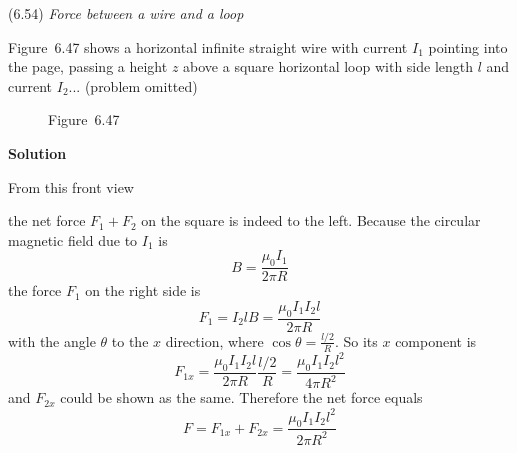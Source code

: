 \documentclass{article}
\begin{document}
\begin{homeworkProblem}
	(6.54) \textit{Force between a wire and a loop}
	
	Figure~6.47 shows a horizontal infinite straight wire with current $I_1$ pointing into the page, passing a height $z$ above a square horizontal loop with side length $l$ and current $I_2$... (problem omitted)
	\begin{figure}[H]
		\centering
		\caption{Figure~6.47}
	\end{figure}

	\textbf{Solution}

	From this front view
	\begin{figure}[H]
		\centering
	\end{figure}
	the net force $F_1+F_2$ on the square is indeed to the left. Because the circular magnetic field due to $I_1$ is
	\[
		B=\frac{\mu_0I_1}{2\pi R}
	\]
	the force $F_1$ on the right side is
	\[
		F_1=I_2lB=\frac{\mu_0I_1I_2l}{2\pi R}
	\]
	with the angle $\theta$ to the $x$ direction, where $\cos\theta=\frac{l/2}{R}$. So its $x$ component is
	\[
		F_{1x}=\frac{\mu_0I_1I_2l}{2\pi R}\frac{l/2}{R}=\frac{\mu_0I_1I_2l^2}{4\pi R^2}
	\]
	and $F_{2x}$ could be shown as the same. Therefore the net force equals
	\[
		F=F_{1x}+F_{2x}=\frac{\mu_0I_1I_2l^2}{2\pi R^2}
	\]
\end{homeworkProblem}

\end{document}

